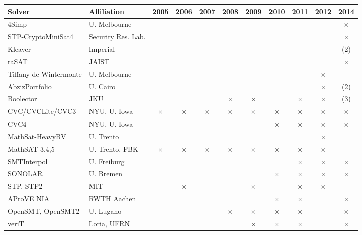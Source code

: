 \documentclass[twosize,11pt]{article}
\begin{document}
\begin{table}[t]
\renewcommand{\mark}[0]{$\times$}
\centering
\setlength{\tabcolsep}{1pt}
\begin{tabular}{|l|l|c|c|c|c|c|c|c|c|c|}
\hline
Solver & Affiliation & 2005 & 2006 & 2007 & 2008 & 2009 & 2010 & 2011 & 2012 & 2014 \\
\hline

4Simp                  & U. Melbourne 	&   &   &   &   &   &   &   &   & \mark  \\							
STP-CryptoMiniSat4     & Security Res. Lab.  &   &   &   &   &   &   &   &   & \mark\\								
Kleaver	               & Imperial       &   &   &   &   &   &   &   &   & (2) \\								
raSAT  	               & JAIST          &   &   &   &   &   &   &   &   & \mark \\								
Tiffany de Wintermonte & U. Melbourne 	&   &   &   &   &   &   &   & \mark &  \\							
AbzizPortfolio         & U. Cairo       &   &   &   &   &   &   &   & \mark & (2)\\							
Boolector              & JKU            &   &   &   & \mark & \mark &   & \mark & \mark & (3)\\
CVC/CVCLite/CVC3       & NYU, U. Iowa   & \mark & \mark & \mark & \mark & \mark & \mark & \mark & \mark & \mark \\
CVC4	                 & NYU, U. Iowa   &   &   &   &   &   & \mark & \mark & \mark & \mark \\
MathSat-HeavyBV        & U. Trento      &   &   &   &   &   &   &   & \mark &   \\								
MathSAT 3,4,5          & U. Trento, FBK & \mark & \mark & \mark & \mark & \mark & \mark & \mark & \mark &   \\
SMTInterpol            & U. Freiburg    &   &   &   &   &   &   & \mark & \mark & \mark \\
SONOLAR                & U. Bremen      &   &   &   &   &   & \mark & \mark & \mark & \mark \\
STP, STP2              & MIT            &   & \mark &   &   & \mark &   & \mark & \mark &   \\
AProVE NIA             & RWTH Aachen    &   &   &   &   &   & \mark & \mark &   & \mark \\
OpenSMT, OpenSMT2      & U. Lugano      &   &   &   & \mark & \mark & \mark & \mark &   & \mark \\
veriT                  & Loria, UFRN           &   &   &   &   & \mark & \mark & \mark &   & \mark \\

\end{tabular}
\end{table}
\end{document}

